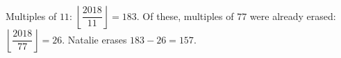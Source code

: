 Multiples of $11$: $\left\lfloor\dfrac{2018}{11}\right\rfloor=183$. Of these, multiples of $77$ were already erased: $\left\lfloor\dfrac{2018}{77}\right\rfloor=26$. Natalie erases $183-26=\boxed{157}$.
